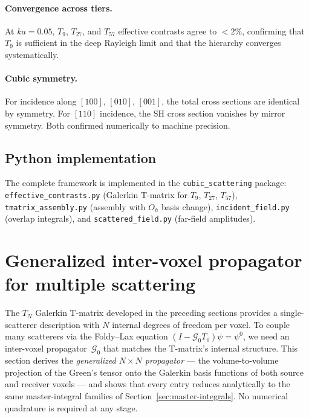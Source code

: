 \documentclass[11pt,a4paper]{article}
\newcommand{\Oh}{O_h}
\newcommand{\Gprop}{\mathcal{G}_0}
\theoremstyle{plain}
\theoremstyle{definition}
\theoremstyle{remark}
\begin{document}
\paragraph{Convergence across tiers.}
At $ka = 0.05$, $T_9$, $T_{27}$, and $T_{57}$ effective contrasts
agree to $<2\%$, confirming that $T_9$ is sufficient in the deep
Rayleigh limit and that the hierarchy converges systematically.

\paragraph{Cubic symmetry.}
For incidence along $[100]$, $[010]$, $[001]$, the total cross sections
are identical by symmetry.  For $[110]$ incidence, the SH cross section
vanishes by mirror symmetry.  Both confirmed numerically to machine
precision.

\subsection{Python implementation}

The complete framework is implemented in the \texttt{cubic\_scattering}
package: \texttt{effective\_contrasts.py} (Galerkin T-matrix for
$T_9$, $T_{27}$, $T_{57}$), \texttt{tmatrix\_assembly.py} (assembly
with $\Oh$ basis change), \texttt{incident\_field.py} (overlap
integrals), and \texttt{scattered\_field.py} (far-field amplitudes).


\section{Generalized inter-voxel propagator for multiple scattering}
\label{sec:inter-voxel}

The $T_N$ Galerkin T-matrix developed in the preceding sections
provides a single-scatterer description with $N$ internal degrees of
freedom per voxel.  To couple many scatterers via the Foldy--Lax
equation $(I - \Gprop T_0)\psi = \psi^0$, we need an inter-voxel
propagator~$\Gprop$ that matches the T-matrix's internal structure.
This section derives the \emph{generalized $N \times N$ propagator}
--- the volume-to-volume projection of the Green's tensor onto the
Galerkin basis functions of both source and receiver voxels --- and
shows that every entry reduces analytically to the same
master-integral families of Section~\ref{sec:master-integrals}.
No numerical quadrature is required at any stage.
\end{document}
